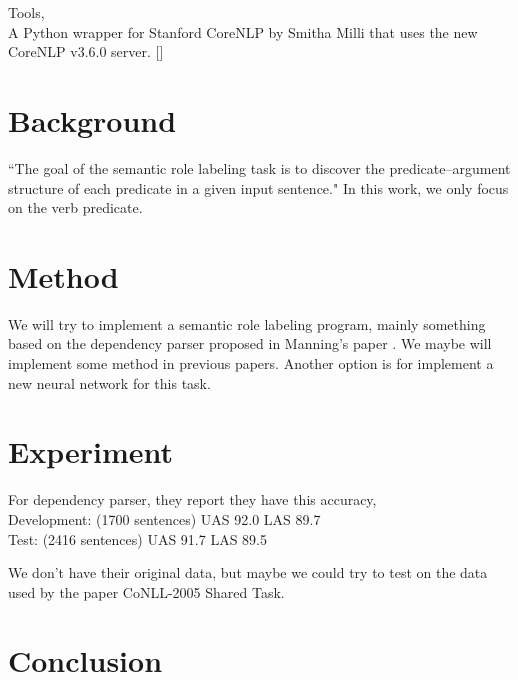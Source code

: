 \documentclass[letterpaper]{article}
\begin{document}
\bigskip
Tools,\\
A Python wrapper for Stanford CoreNLP by Smitha Milli that uses the new CoreNLP v3.6.0 server. []

\section{Background}
``The goal of the semantic role labeling task is to discover the predicate–argument structure
of each predicate in a given input sentence."\cite{} In this work, we only focus on the verb predicate.

\section{Method}
We will try to implement a semantic role labeling program, mainly something based on the dependency parser proposed in Manning's paper \cite{manning-EtAl:2014:P14-5}. We maybe will implement some method in previous papers. Another option is for implement a new neural network for this task.

\section{Experiment}
For dependency parser, they report they have this accuracy,\\
Development: 	(1700 sentences)	UAS	92.0	LAS	89.7\\
Test:			(2416 sentences)	UAS	91.7	LAS	89.5

We don't have their original data, but maybe we could try to test on the data used by the paper CoNLL-2005 Shared Task.




\section{Conclusion}





\end{document}
